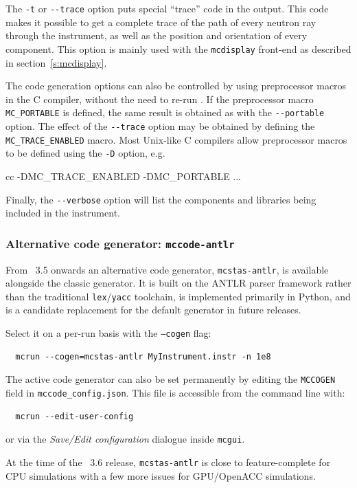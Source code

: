 The \verb+-t+ or \verb+--trace+ option puts special ``trace'' code in
the output. This code makes it possible to get a complete trace of the
path of every neutron ray through the instrument, as well as the position
and orientation of every component. This option is mainly used with the
\verb+mcdisplay+ front-end as described in section~\ref{s:mcdisplay}.

The code generation options can also be controlled by using preprocessor
macros in the C compiler, without the need to re-run \mcs.
If the preprocessor macro \verb+MC_PORTABLE+ is defined, the
same result is obtained as with the \verb+--portable+ option.
The effect of the \verb+--trace+ option may be obtained
by defining the \verb+MC_TRACE_ENABLED+ macro. Most Unix-like C
compilers allow preprocessor macros to be defined using the \verb+-D+
option, e.g.
\begin{bash}
    cc -DMC_TRACE_ENABLED -DMC_PORTABLE ...
\end{bash}
Finally, the \verb+--verbose+ option will list the components and libraries being
included in the instrument.

\subsubsection{Alternative code generator: \texttt{mccode-antlr}}
\label{s:antlr}

From \McStas~3.5 onwards an alternative code generator,
\texttt{mcstas-antlr}, is available alongside the classic generator.
It is built on the ANTLR parser framework rather than the traditional
\texttt{lex}/\texttt{yacc} toolchain, is implemented primarily in Python,
and is a candidate replacement for the default generator in future releases.

Select it on a per-run basis with the \texttt{--cogen} flag:
\begin{verbatim}
  mcrun --cogen=mcstas-antlr MyInstrument.instr -n 1e8
\end{verbatim}

The active code generator can also be set permanently by editing the
\texttt{MCCOGEN} field in \texttt{mccode\_config.json}.  This file is
accessible from the command line with:
\begin{verbatim}
  mcrun --edit-user-config
\end{verbatim}
or via the \emph{Save/Edit configuration} dialogue inside \texttt{mcgui}.

At the time of the \McStas~3.6 release, \texttt{mcstas-antlr} is close to
feature-complete for CPU simulations with a few more issues for GPU/OpenACC
simulations.


